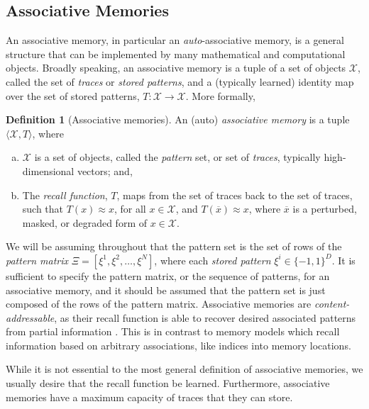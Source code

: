 \documentclass{article}
\theoremstyle{definition}
\newtheorem{definition}{Definition}[subsection]
\begin{document}
\subsection{Associative Memories}\label{sec:associative-memories}

An associative memory, in particular an \textit{auto}-associative memory,
is a general structure that can be implemented by many mathematical
and computational objects. Broadly speaking, an associative memory is a
tuple of a set of objects $\mathcal X$, called the set of
\textit{traces} or \textit{stored patterns},
and a (typically learned) identity map over the set of stored
patterns, $T: \mathcal X \to \mathcal X$.
More formally,

\begin{definition}[Associative memories]
  An (auto) \textit{associative memory} is a tuple $\langle \mathcal
  X, T \rangle$, where
  \begin{enumerate}[(a)]
    \item $\mathcal X$ is a set of objects, called the
      \textit{pattern} set, or set of \textit{traces}, typically
      high-dimensional vectors; and,
    \item The \textit{recall function}, $T$, maps from the set
      of traces back to
      the set of traces, such that $T(x) \approx x$, for all $x \in
      \mathcal{X}$,
      and $T(\overline x) \approx x$, where $\overline x$ is a
      perturbed, masked, or degraded form of $x \in \mathcal{X}$.
  \end{enumerate}
\end{definition}

We will be assuming throughout that the pattern set is the set of rows
of the \textit{pattern matrix} $\Xi = [\xi^1, \xi^2, \dots, \xi^N]$,
where each \textit{stored pattern} $\xi^i \in \{-1, 1\}^D$. It is sufficient
to specify the pattern matrix, or the sequence of patterns, for an
associative memory,
and it should be assumed that the pattern set is just composed of the
rows of the pattern matrix.
Associative memories are \textit{content-addressable}, as their recall function
is able to recover desired associated patterns from partial information
\parencites{mcclelland_appeal_1986,haykin_neural_2009}. This is in
contrast to memory models which recall information based on arbitrary
associations, like indices into memory locations.

While it is not essential to the most general definition of
associative memories,
we usually desire that the recall function be learned. Furthermore,
associative memories have a maximum capacity of traces that they can store.
\end{document}
